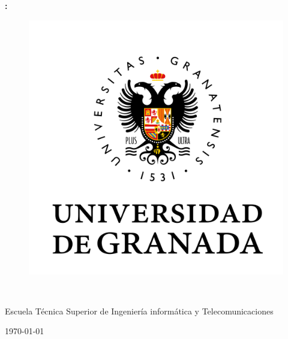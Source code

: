 \documentclass{memoria}
\begin{document}
\pagestyle{empty} %


\begin{center}
\LARGE{\bf \thetitle:}\\
\end{center}





\begin{figure}[H]
\centering
\includegraphics[scale=0.8]{imagenes/logo.png}
\end{figure}


\begin{center}
\theauthor
\\
\end{center}

\begin{center}
Escuela Técnica Superior de Ingeniería informática y Telecomunicaciones

\end{center}


\begin{center}
\today
\end{center}
\end{document}
